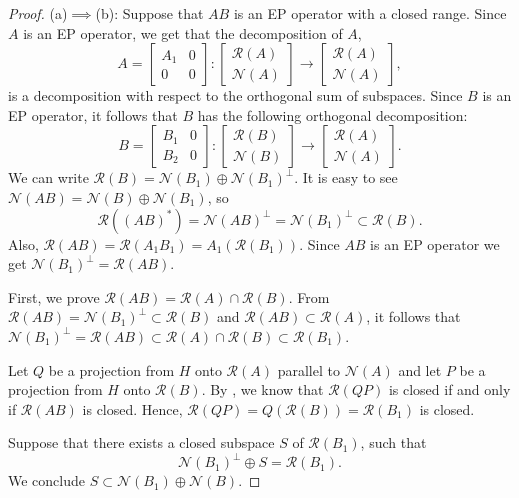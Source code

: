 \documentclass{proc-l}
\theoremstyle{plain}
\theoremstyle{remark}
\theoremstyle{definition}
\newcommand{\R}{\mathcal{R}}
\newcommand{\N}{\mathcal{N}}
\begin{document}
\begin{proof} (a)$\implies $(b): Suppose that $AB$ is an EP operator 
with a
closed range.
Since $A$ is
an EP operator,  we get that the decomposition of $A$,
\begin{equation*}A=\begin{bmatrix}A_{1}&0\\0&0\end{bmatrix}
:\begin{bmatrix}\R (A)\\\N (A)\end{bmatrix}
\to \begin{bmatrix}\R (A)\\\N (A)\end{bmatrix},
\end{equation*}
is a decomposition with respect to the orthogonal sum of subspaces.
Since $B$ is an EP operator,  it follows that $B$ has the following
orthogonal decomposition:
\begin{equation*}B=\begin{bmatrix}B_{1}&0\\ B_{2}&0\end{bmatrix}
:\begin{bmatrix}\R (B)\\\N (B)\end{bmatrix}
\to \begin{bmatrix}\R (A)\\\N (A)\end{bmatrix}
.\end{equation*}
We can write $\R (B)=\N (B_{1})\oplus \N (B_{1})^{\bot }$.
It is easy to see $\N (AB)=\N (B)\oplus \N (B_{1})$, so
\begin{equation*}\R ((AB)^{*})=\N (AB)^{\bot }=\N (B_{1})^{\bot }\subset\R 
(B).\end{equation*}
Also, $\R (AB)=\R (A_{1}B_{1})=A_{1}(\R (B_{1}))$. Since $AB$ is an EP 
operator we
get $\N (B_{1})^{\bot }=\R (AB)$.

First, we prove $\R (AB)=\R (A)\cap \R (B)$. From
$\R (AB)=\N (B_{1})^{\bot }\subset\R (B)$ and $\R (AB)\subset\R (A)$, it 
follows that
$\N (B_{1})^{\bot }=\R (AB)\subset\R (A)\cap \R (B)\subset\R (B_{1})$.

Let $Q$ be a projection from $H$ onto $\R (A)$ parallel to $\N (A)$ and
let $P$ be a projection from $H$ onto $\R (B)$. By \cite[Theorem 1, 
p.~127]{4}, we know that $\R (QP)$ is closed if and only if
$\R (AB)$ is closed. Hence,  $\R (QP)=Q(\R (B))=\R (B_{1})$ is closed.

Suppose that there exists a closed subspace $S$ of $\R (B_{1})$, such 
that
\begin{equation*}\N (B_{1})^{\bot }\oplus S=\R (B_{1}).\end{equation*}
We conclude  $S\subset\N (B_{1})\oplus \N (B)$.


\end{proof}
\end{document}
